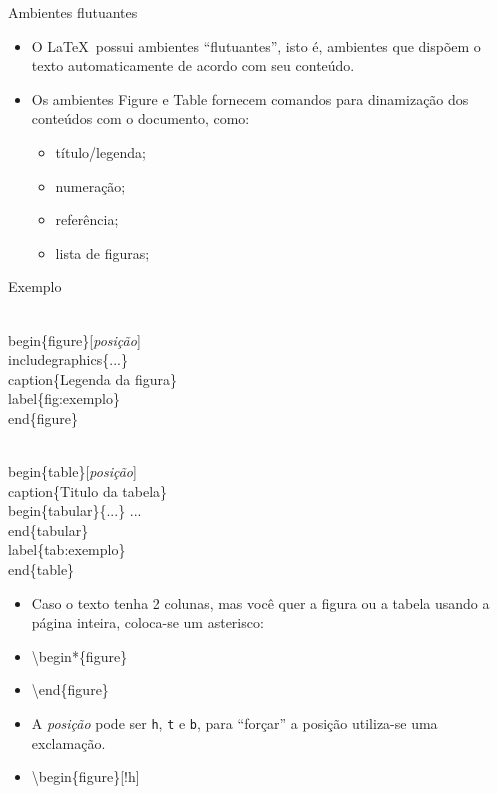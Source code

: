 \begin{frame}{Ambientes flutuantes}
    \begin{itemize}
    \item O \LaTeX\ possui ambientes ``flutuantes'', isto é, ambientes que dispõem o texto automaticamente de acordo com seu conteúdo.
    \item Os ambientes Figure e Table fornecem comandos para dinamização dos conteúdos com o documento, como:
        \begin{itemize}
        \item título/legenda;
        \item numeração;
        \item referência;
        \item lista de figuras;
        \end{itemize}
    \end{itemize}

    \begin{exampleblock}{Exemplo}
        \begin{semiverbatim}
\\begin\{figure\}[\textit{posição}]
  \\includegraphics\{...\}
  \\caption\{Legenda da figura\}
  \\label\{fig:exemplo\}
\\end\{figure\}

\\begin\{table\}[\textit{posição}]
  \\caption\{Titulo da tabela\}
  \\begin\{tabular\}\{...\}
  ...
  \\end\{tabular\}
  \\label\{tab:exemplo\}
\\end\{table\}
\end{semiverbatim}
    \end{exampleblock}

    \begin{itemize}
    \item Caso o texto tenha 2 colunas, mas você quer a figura ou a tabela usando a página inteira, coloca-se um asterisco:
    \item[] {\small \textbackslash begin\alert{*}\{figure\}}
    \item[] {\small \textbackslash end\{figure\}}

    \vspace{.5cm}

    \item A \textit{posição} pode ser \verb|h|, \verb|t| e \verb|b|, para ``forçar'' a posição utiliza-se uma exclamação.
    \item[] {\small \textbackslash begin\{figure\}[\alert{!}h]}
    \end{itemize}
\end{frame}



